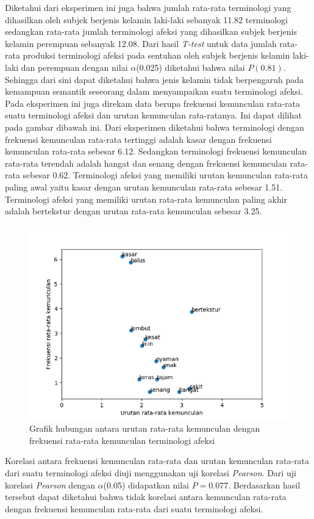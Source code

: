 \documentclass{Jurnal_kolo}
\begin{document}
\begin{multicols}{2}
	\indent Diketahui dari eksperimen ini juga bahwa jumlah rata-rata terminologi yang dihasilkan oleh subjek berjenis kelamin laki-laki sebanyak 11.82 terminologi sedangkan rata-rata jumlah terminologi afeksi yang dihasilkan subjek berjenis kelamin perempuan sebanyak 12.08. Dari hasil \emph{T-test} untuk data jumlah rata-rata produksi terminologi afeksi pada sentuhan oleh subjek berjenis kelamin laki-laki dan perempuan dengan nilai $\alpha$(0.025) diketahui bahwa nilai $P(0.81)$. Sehingga dari sini dapat diketahui bahwa jenis kelamin tidak berpengaruh pada kemampuan semantik seseorang dalam menyampaikan suatu terminologi afeksi.\\
	\indent Pada eksperimen ini juga direkam data berupa frekuensi kemunculan rata-rata suatu terminologi afeksi dan urutan kemunculan rata-ratanya. Ini dapat dilihat pada gambar dibawah ini. Dari eksperimen diketahui bahwa terminologi dengan frekuensi kemunculan rata-rata tertinggi adalah kasar dengan frekuensi kemunculan rata-rata sebesar 6.12. Sedangkan terminologi frekuensi kemunculan rata-rata terendah adalah hangat dan senang dengan frekuensi kemunculan rata-rata sebesar 0.62. Terminologi afeksi yang memiliki urutan kemunculan  rata-rata paling awal yaitu kasar dengan urutan kemunculan rata-rata sebesar 1.51. Terminologi afeksi yang memiliki urutan rata-rata kemunculan paling akhir adalah bertekstur dengan urutan rata-rata kemunculan sebesar 3.25.
		\begin{figure}[H]
		\centering
		\includegraphics[scale=0.5]{gambar/grafik1}
		\caption{Grafik hubungan antara urutan rata-rata kemunculan dengan frekuensi rata-rata kemunculan terminologi afeksi}
		\label{grap11}
	\end{figure}
	\indent Korelasi antara frekuensi kemunculan rata-rata dan urutan kemunculan rata-rata dari suatu terminologi afeksi diuji menggunakan uji korelasi \emph{Pearson}. Dari uji korelasi \emph{Pearson} dengan $\alpha$(0.05) didapatkan nilai $P=0.077$. Berdasarkan hasil tersebut dapat diketahui bahwa tidak korelasi antara kemunculan rata-rata dengan frekuensi kemunculan rata-rata dari suatu terminologi afeksi.
	

\end{multicols}
\end{document}

